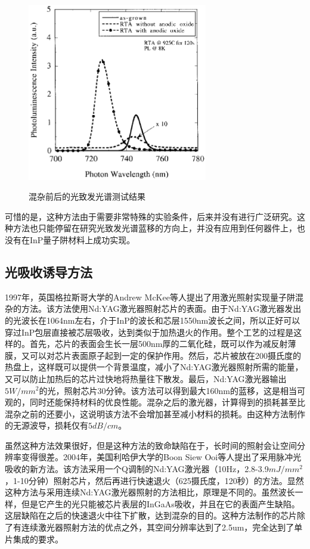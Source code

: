 \documentclass[oneside]{ZJUthesis}
\begin{document}
\begin{figure}[!h]
  \centering
  \includegraphics[width=0.7\textwidth]{./Pictures/oxide_pl.eps}\\
  \caption{混杂前后的光致发光谱测试结果}
  \label{fig_oxide_pl}
\end{figure}

可惜的是，这种方法由于需要非常特殊的实验条件，后来并没有进行广泛研究。这种方法也只能停留在研究光致发光谱蓝移的方向上，并没有应用到任何器件上，也没有在InP量子阱材料上成功实现。

\subsection{光吸收诱导方法}

1997年，英国格拉斯哥大学的Andrew McKee等人提出了用激光照射实现量子阱混杂的方法\cite{mckee1997monolithic-PAID}。该方法使用Nd:YAG激光器照射芯片的表面。由于Nd:YAG激光器发出的光波长在1064nm左右，介于InP的波长和芯层1550nm波长之间，所以正好可以穿过InP包层直接被芯层吸收，达到类似于加热退火的作用。整个工艺的过程是这样的。首先，芯片的表面会生长一层500nm厚的二氧化硅，既可以作为减反射薄膜，又可以对芯片表面原子起到一定的保护作用。然后，芯片被放在200摄氏度的热盘上，这样既可以提供一个背景温度，减小了Nd:YAG激光器照射所需的能量，又可以防止加热后的芯片过快地将热量往下散发。最后，Nd:YAG激光器输出$5W/mm^2$的光，照射芯片30分钟。该方法可以得到最大160nm的蓝移，这是相当可观的，同时还能保持材料的优良性能。混杂之后的激光器，计算得到的损耗甚至比混杂之前的还要小，这说明该方法不会增加甚至减小材料的损耗。由这种方法制作的无源波导，损耗仅有$5dB/cm$。

虽然这种方法效果很好，但是这种方法的致命缺陷在于，长时间的照射会让空间分辨率变得很差。2004年，美国利哈伊大学的Boon Siew Ooi等人提出了采用脉冲光吸收的新方法\cite{ooi2004multiple}。该方法采用一个Q调制的Nd:YAG激光器（10Hz，2.8-3.9$mJ/mm^2$，1-10分钟）照射芯片，然后再进行快速退火（625摄氏度，120秒）的方法。显然这种方法与采用连续Nd:YAG激光器照射的方法相比，原理是不同的。虽然波长一样，但是它产生的光只能被芯片表层的InGaAs吸收，并且在它的表面产生缺陷。这层缺陷在之后的快速退火中往下扩散，达到混杂的目的。这种方法制作的芯片除了有连续激光器照射方法的优点之外，其空间分辨率达到了2.5um，完全达到了单片集成的要求。
\end{document}
